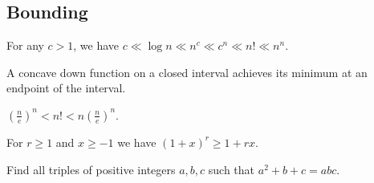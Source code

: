 \subsection{Bounding}
\begin{result}{\label{r:a:n:b:1}}
    For any $c>1$, we have $c\ll\log n\ll n^c\ll c^n\ll
    n!\ll n^n$.
\end{result}
\begin{result}{\label{r:a:n:b:2}}
    A concave down function on a closed interval achieves its minimum at an
    endpoint of the interval.
\end{result}
\begin{result}{\label{r:a:n:b:3}}
  $\left(\frac ne\right)^n<n!<n\left(\frac ne\right)^n$.
\end{result}
\begin{result}{\label{r:a:n:b:4}}
  For $r\ge 1$ and $x\ge -1$ we have $(1+x)^r\ge 1+rx$.
\end{result}
\begin{problem}{\label{p:a:n:b:1}}
  Find all triples of positive integers $a,b,c$ such that $a^2+b+c=abc$.
\end{problem}

